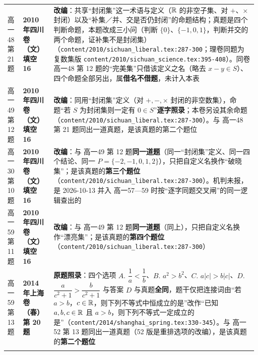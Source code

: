 \documentclass[a4paper,11pt]{article}
\begin{document}
\begin{xltabular}{\textwidth}{@{}>{\raggedright\arraybackslash}p{2.85cm}>{\raggedright\arraybackslash}p{3.99cm}>{\raggedright\arraybackslash}p{7.89cm}@{}}
高一48 第 21 题 & \textbf{2010 年四川卷（文）填空 16} & \textbf{改编}：共享``封闭集''这一术语与定义（\(\mathbb{R}\) 的非空子集、对 \(+\allowbreak \)、\(\times\allowbreak \) 封闭）以及``补集／并、交是否仍封闭''的命题结构；真题是四个判断命题，本题改成三小问（判断 \(\{0\}\)、\(\{-1,\allowbreak 0,\allowbreak 1\}\)，判断并交的两个命题，证补集不是封闭集）（\texttt{content/\allowbreak{}2010/\allowbreak{}sichuan\_liberal.tex:287-\allowbreak{}300}；理卷同题为复数集版 \texttt{content/\allowbreak{}2010/\allowbreak{}sichuan\_science.tex:395-\allowbreak{}408}）。同卷 高一48 第 12 题的``完美集''只借该定义之名（略去 \(x-y\in S\)）、四个命题全部另出，属\textbf{借名不借题}，未计入本表 \\ \addlinespace[1pt]
高一49 第 12 题 & \textbf{2010 年四川卷（文）填空 16} & \textbf{改编}：同用``封闭集''定义（对 \(+\allowbreak ,\allowbreak -,\allowbreak \times\allowbreak \) 封闭的非空数集），命题``若 \(S\) 为封闭集则一定有 \(0\in S\)''\textbf{逐字照录}；本卷另设其余命题（\texttt{content/\allowbreak{}2010/\allowbreak{}sichuan\_liberal.tex:287-\allowbreak{}300}）。与 高一48 第 21 题同出一道真题，是该真题的第二个题位 \\ \addlinespace[1pt]
高一30 第 10 题 & \textbf{2010 年四川卷（文）填空 16} & \textbf{改编}：与 高一49 第 12 题\textbf{同一道题}（同一``封闭集''定义、同一四个结论、同一 \(P=\allowbreak \{-2,\allowbreak -1,\allowbreak 0,\allowbreak 1,\allowbreak 2\}\)），只把自定义名换作``破晓集''；是该真题的\textbf{第三个题位}（\texttt{content/\allowbreak{}2010/\allowbreak{}sichuan\_liberal.tex:287-\allowbreak{}300}）。机判未报，是 2026-10-13 并入 高一57---59 时按``逐字同题交叉闸''的同一逻辑查出的 \\ \addlinespace[1pt]
高一59 第 11 题 & \textbf{2010 年四川卷（文）填空 16} & \textbf{改编}：与 高一49 第 12 题\textbf{同一道题}（同上），只把自定义名换作``漂亮集''；是该真题的\textbf{第四个题位}（\texttt{content/\allowbreak{}2010/\allowbreak{}sichuan\_liberal.tex:287-\allowbreak{}300}） \\ \addlinespace[1pt]
高一59 第 13 题 & \textbf{2014 年上海卷（春）第 20 题} & \textbf{原题照录}：四个选项 \(A.\) \(\dfrac1a<\dfrac1b\)、\(B.\) \(a^2>b^2\)、\(C.\) \(a\lvert c\rvert>b\lvert c\rvert\)、\(D.\) \(\dfrac a{c^2+\allowbreak 1}>\dfrac b{c^2+\allowbreak 1}\) 与答案 \(D\) 与真题\textbf{全同}，题干仅把连接词由``若 \(a>b\)，\(c\in\mathbb{R}\)，则下列不等式中恒成立的是''改作``已知 \(a,b,c\in\mathbb{R}\) 且 \(a>b\)，则下列不等式一定成立的是''（\texttt{content/\allowbreak{}2014/\allowbreak{}shanghai\_spring.tex:330-\allowbreak{}345}）。与 高一52 第 13 题同出一道真题（52 版是重排选项的改编），是该真题的\textbf{第二个题位} \\ \addlinespace[1pt]

\end{xltabular}
\end{document}
